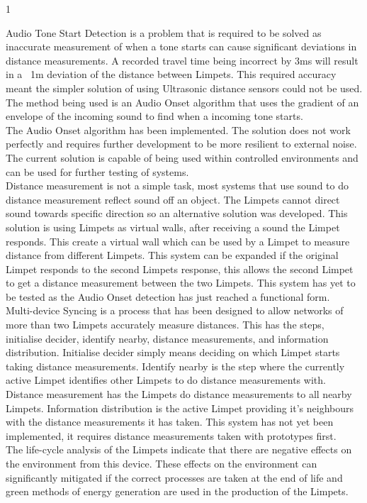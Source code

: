 1\documentclass{article}
\begin{document}
Audio Tone Start Detection is a problem that is required to be solved as inaccurate measurement of when a tone starts can cause significant deviations in distance measurements. A recorded travel time being incorrect by 3ms will result in a ~1m deviation of the distance between Limpets. This required accuracy meant the simpler solution of using Ultrasonic distance sensors could not be used. The method being used is an Audio Onset algorithm that uses the gradient of an envelope of the incoming sound to find when a incoming tone starts.\\

The Audio Onset algorithm has been implemented. The solution does not work perfectly and requires further development to be more resilient to external noise. The current solution is capable of being used within controlled environments and can be used for further testing of systems.\\

Distance measurement is not a simple task, most systems that use sound to do distance measurement reflect sound off an object. The Limpets cannot direct sound towards specific direction so an alternative solution was developed. This solution is using Limpets as virtual walls, after receiving a sound the Limpet responds. This create a virtual wall which can be used by a Limpet to measure distance from different Limpets. This system can be expanded if the original Limpet responds to the second Limpets response, this allows the second Limpet to get a distance measurement between the two Limpets. This system has yet to be tested as the Audio Onset detection has just reached a functional form.\\

Multi-device Syncing is a process that has been designed to allow networks of more than two Limpets accurately measure distances. This has the steps, initialise decider, identify nearby, distance measurements, and information distribution. Initialise decider simply means deciding on which Limpet starts taking distance measurements. Identify nearby is the step where the currently active Limpet identifies other Limpets to do distance measurements with. Distance measurement has the Limpets do distance measurements to all nearby Limpets. Information distribution is the active Limpet providing it's neighbours with the distance measurements it has taken. This system has not yet been implemented, it requires distance measurements taken with prototypes first.\\

The life-cycle analysis of the Limpets indicate that there are negative effects on the environment from this device. These effects on the environment can significantly mitigated if the correct processes are taken at the end of life and green methods of energy generation are used in the production of the Limpets.


\pagebreak


\end{document}
